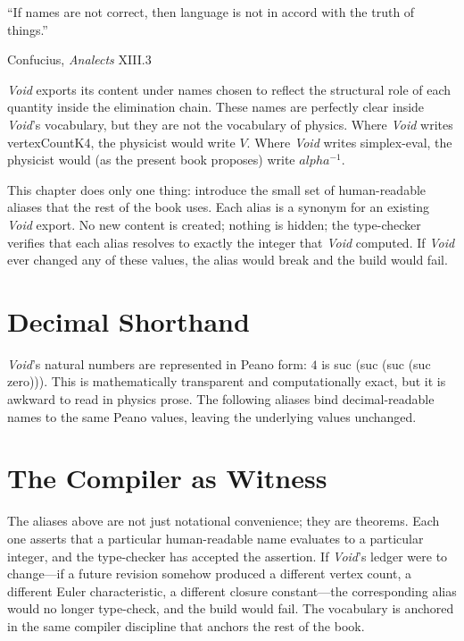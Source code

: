 \documentclass[11pt,a4paper]{book}
\def\alpha{alpha}%
\def\texttt#1{#1}%
\begin{document}

\epigraph{``If names are not correct, then language is not in accord with the truth of things.''}{Confucius, \textit{Analects} XIII.3}

\textit{Void} exports its content under names chosen to reflect the structural role of each quantity inside the elimination chain. These names are perfectly clear inside \textit{Void}'s vocabulary, but they are not the vocabulary of physics. Where \textit{Void} writes \texttt{vertexCountK4}, the physicist would write $V$. Where \textit{Void} writes \texttt{simplex-eval}, the physicist would (as the present book proposes) write $\alpha^{-1}$.

This chapter does only one thing: introduce the small set of human-readable aliases that the rest of the book uses. Each alias is a synonym for an existing \textit{Void} export. No new content is created; nothing is hidden; the type-checker verifies that each alias resolves to exactly the integer that \textit{Void} computed. If \textit{Void} ever changed any of these values, the alias would break and the build would fail.

\section*{Decimal Shorthand}

\textit{Void}'s natural numbers are represented in Peano form: $4$ is \texttt{suc (suc (suc (suc zero)))}. This is mathematically transparent and computationally exact, but it is awkward to read in physics prose. The following aliases bind decimal-readable names to the same Peano values, leaving the underlying values unchanged.


\section*{The Compiler as Witness}

The aliases above are not just notational convenience; they are theorems. Each one asserts that a particular human-readable name evaluates to a particular integer, and the type-checker has accepted the assertion. If \textit{Void}'s ledger were to change---if a future revision somehow produced a different vertex count, a different Euler characteristic, a different closure constant---the corresponding alias would no longer type-check, and the build would fail. The vocabulary is anchored in the same compiler discipline that anchors the rest of the book.
\end{document}
